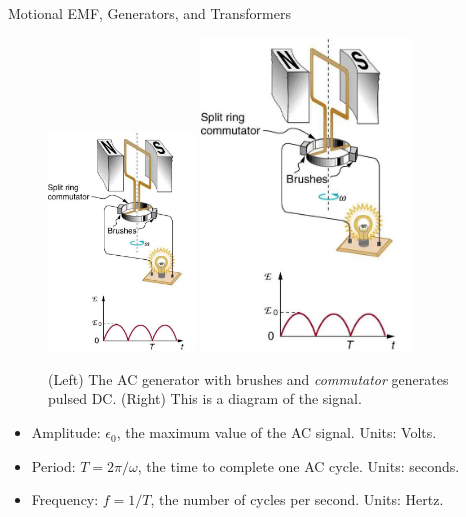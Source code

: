 \documentclass{beamer}
\begin{document}
\begin{frame}{Motional EMF, Generators, and Transformers}
\footnotesize
\begin{figure}
\centering
\includegraphics[width=0.35\textwidth,trim=0cm 8cm 0cm 0cm,clip=true]{figures/generator_2.png}
\includegraphics[width=0.5\textwidth,trim=0cm 0cm 0cm 20cm,clip=true]{figures/generator_2.png}
\caption{\label{fig:motion_emf3} (Left) The AC generator with brushes and \textit{commutator} generates pulsed DC. (Right) This is a diagram of the signal.}
\end{figure}
\begin{itemize}
\item Amplitude: $\epsilon_0$, the maximum value of the AC signal. Units: Volts.
\item Period: $T = 2\pi/\omega$, the time to complete one AC cycle.  Units: seconds.
\item Frequency: $f = 1/T$, the number of cycles per second.  Units: Hertz.
\end{itemize}
\end{frame}
\end{document}
